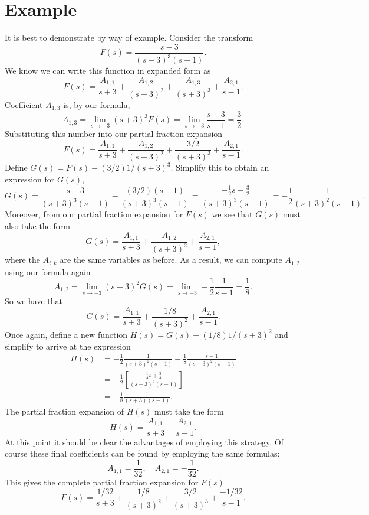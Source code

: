 \section{Example}
It is best to demonstrate by way of example.
Consider the transform
\[
  F(s)
    =
      \frac{s - 3}{(s + 3)^3 (s - 1)}.
\]
We know we can write this function in expanded form as
\[
  F(s)
    =
      \frac{A_{1,1}}{s + 3} + \frac{A_{1,2}}{(s + 3)^2} + \frac{A_{1,3}}{(s + 3)^3}
      +
      \frac{A_{2,1}}{s - 1}. 
\]
Coefficient \(A_{1, 3}\) is, by our formula,
\[
  A_{1, 3} 
    =
      \lim_{s \to -3} (s + 3)^3 F(s)
    =
      \lim_{s \to -3} \frac{s - 3}{s - 1}
    =
      \frac{3}{2}.
\]
Substituting this number into our partial fraction expansion
\[
  F(s)
    =
      \frac{A_{1,1}}{s + 3} + \frac{A_{1,2}}{(s + 3)^2} + \frac{3/2}{(s + 3)^3}
      +
      \frac{A_{2,1}}{s - 1}. 
\]
Define \(G(s) = F(s) - (3/2)1/(s + 3)^3.\)
Simplify this to obtain an expression for \(G(s),\)
\[
  G(s)
    =
      \frac{s - 3}{(s + 3)^3 (s - 1)} - \frac{(3/2)(s - 1)}{(s + 3)^3 (s - 1)}
    =
      \frac{-\frac{1}{2}s - \frac{3}{2}}{(s + 3)^3 (s - 1)}
    =
      -\frac{1}{2}
      \frac{1}{(s+3)^2 (s - 1)}.
\]
Moreover, from our partial fraction expansion for \(F(s)\) we see that \(G(s)\) must also take the form
\[
  G(s)
    =
      \frac{A_{1,1}}{s + 3} + \frac{A_{1,2}}{(s + 3)^2}
      +
      \frac{A_{2,1}}{s - 1},
\]
where the \(A_{i, k}\) are the same variables as before.
As a result, we can compute \(A_{1, 2}\) using our formula again
\[
  A_{1, 2} 
    =
      \lim_{s \to -3} (s + 3)^2 G(s)
    =
      \lim_{s \to -3} -\frac{1}{2}\frac{1}{s - 1}
    =
      \frac{1}{8}.
\]
So we have that
\[
  G(s)
    =
      \frac{A_{1,1}}{s + 3} + \frac{1/8}{(s + 3)^2}
      +
      \frac{A_{2,1}}{s - 1}.
\]
Once again, define a new function \(H(s) = G(s) - (1/8) 1/(s+3)^2\) and simplify to arrive at the expression
\[
\begin{aligned}
  H(s) 
    &=
      -\frac{1}{2}
      \frac{1}{(s+3)^2 (s - 1)}
      -
      \frac{1}{8}
      \frac{s - 1}{(s+3)^2 (s-1)}\\
    &=
      -\frac{1}{2}
      \left[
        \frac{\frac{1}{4} s + \frac{3}{4}}{(s+3)^2 (s-1)}
      \right]\\
    &=
      -\frac{1}{8}
      \frac{1}{(s+3)(s-1)}.
\end{aligned}
\] 
The partial fraction expansion of \(H(s)\) must take the form
\[
  H(s)
    =
      \frac{A_{1,1}}{s + 3}
      +
      \frac{A_{2,1}}{s - 1}.
\]
At this point it should be clear the advantages of employing this strategy.
Of course these final coefficients can be found by employing the same formulas:
\[
  A_{1, 1} = \frac{1}{32},\quad A_{2,1} = -\frac{1}{32}.
\]
This gives the complete partial fraction expansion for \(F(s)\)
\[
  F(s)
    =
      \frac{1/32}{s + 3} + \frac{1/8}{(s + 3)^2} + \frac{3/2}{(s + 3)^3}
      +
      \frac{-1/32}{s - 1}. 
\]
